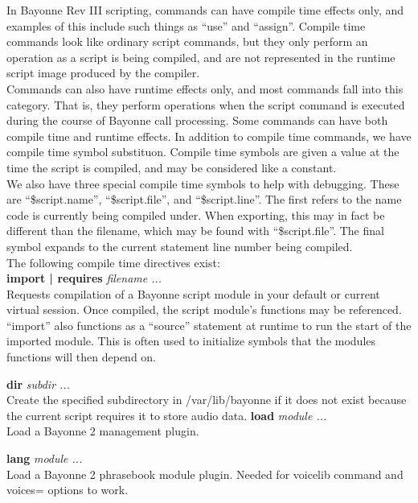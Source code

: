 \documentclass[a4paper,12pt]{article}
\begin{document}
In Bayonne Rev III scripting, commands can have compile time effects
only, and examples of this include such things as ``use'' and
``assign''.  Compile time commands look like ordinary script commands, but
they only perform an operation as a script is being compiled, and are not
represented in the runtime script image produced by the compiler. \\

Commands can also have runtime effects only, and most commands fall into
this category. That is, they perform operations when the script command
is executed during the course of Bayonne call processing.  Some commands
can have both compile time and runtime effects. In addition to compile
time commands, we have compile time symbol substituon.  Compile time
symbols are given a value at the time the script is compiled, and may be
considered like a constant. \\

We also have three special compile time symbols to help with debugging.
These are ``\$script.name'', ``\$script.file'', and ``\$script.line''.
The first refers to the name code is currently being compiled under.
When exporting, this may in fact be different than the filename, which
may be found with ``\$script.file''.  The final symbol expands to the
current statement line number being compiled. \\

The following compile time directives exist: \\

{\bf import | requires} {\it filename ...} \\
	Requests compilation of a Bayonne script module in your default
	or current virtual session.  Once compiled, the script module's
	functions may be referenced.  ``import'' also functions as a
	``source'' statement at runtime to run the start of the imported
	module.  This is often used to initialize symbols that the modules
	functions will then depend on.

{\bf dir} {\it subdir ...} \\
        Create the specified subdirectory in /var/\-lib/\-bayonne if it does
        not exist because the current script requires it to store audio
        data.
{\bf load} {\it module ...} \\
	Load a Bayonne 2 management plugin.  

{\bf lang} {\it module ...} \\
	Load a Bayonne 2 phrasebook module plugin.  Needed for voicelib
	command and voices= options to work.
\end{document}

